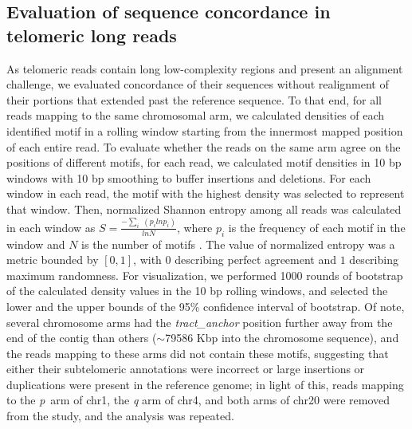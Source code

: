 \documentclass{article}
\begin{document}
\subsection*{Evaluation of sequence concordance in telomeric long reads}
As telomeric reads contain long low-complexity regions and present an alignment challenge, we evaluated concordance of their sequences without realignment of their portions that extended past the reference sequence.
To that end, for all reads mapping to the same chromosomal arm, we calculated densities of each identified motif in a rolling window starting from the innermost mapped position of each entire read.
To evaluate whether the reads on the same arm agree on the positions of different motifs, for each read, we calculated motif densities in 10 bp windows with 10 bp smoothing to buffer insertions and deletions.
For each window in each read, the motif with the highest density was selected to represent that window.
Then, normalized Shannon entropy among all reads was calculated in each window as $ S = \frac{ - \sum_{i} \; ( p_{i} ln p_{i} )}{ln N} $, where $ p_{i} $ is the frequency of each motif in the window and $ N $ is the number of motifs \cite{hepc_entropy}.
The value of normalized entropy was a metric bounded by $ [ 0, 1 ] $, with $ 0 $ describing perfect agreement and $ 1 $ describing maximum randomness.
For visualization, we performed 1000 rounds of bootstrap of the calculated density values in the 10 bp rolling windows, and selected the lower and the upper bounds of the 95\% confidence interval of bootstrap.
Of note, several chromosome arms had the \textit{tract\_anchor} position further away from the end of the contig than others ($\sim$79\textendash{}586 Kbp into the chromosome sequence), and the reads mapping to these arms did not contain these motifs, suggesting that either their subtelomeric annotations were incorrect or large insertions or duplications were present in the reference genome; in light of this, reads mapping to the \mbox{\textit{p} arm} of chr1, the \textit{q} arm of chr4, and both arms of chr20 were removed from the study, and the analysis was repeated.
\end{document}
